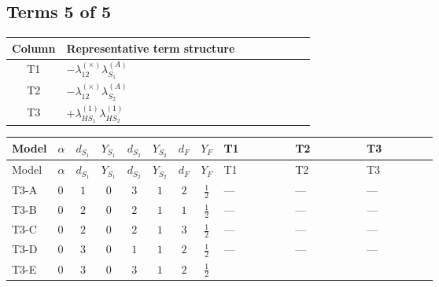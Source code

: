 \documentclass[8pt]{article}
\begin{document}
\begin{landscape}
\subsection*{Terms 5 of 5}
\begin{center}
\begin{tabular}{@{}c >{\raggedright\arraybackslash}p{0.82\linewidth}@{}}
\toprule
Column & Representative term structure \\
\midrule
T1 & \(\displaystyle -{\lambda_{12}^{(\times)}} {\lambda_{S_1}^{(A)}}\) \\
\midrule
T2 & \(\displaystyle -{\lambda_{12}^{(\times)}} {\lambda_{S_2}^{(A)}}\) \\
\midrule
T3 & \(\displaystyle +{\lambda_{HS_1}^{(1)}} {\lambda_{HS_2}^{(1)}}\) \\
\midrule
\bottomrule
\end{tabular}
\end{center}
\smallskip
\tiny
\begin{longtable}{@{}llcccccc >{\raggedright\arraybackslash}p{0.21\linewidth} >{\raggedright\arraybackslash}p{0.21\linewidth} >{\raggedright\arraybackslash}p{0.21\linewidth}@{}}
\toprule
Model & $\alpha$ & $d_{S_1}$ & $Y_{S_1}$ & $d_{S_2}$ & $Y_{S_2}$ & $d_F$ & $Y_F$ & T1 & T2 & T3 \\
\midrule
\endfirsthead
\toprule
Model & $\alpha$ & $d_{S_1}$ & $Y_{S_1}$ & $d_{S_2}$ & $Y_{S_2}$ & $d_F$ & $Y_F$ & T1 & T2 & T3 \\
\midrule
\endhead
T3-A & $0$ & $1$ & $0$ & $3$ & $1$ & $2$ & $\frac{1}{2}$ & --- & --- & --- \\
\midrule
T3-B & $0$ & $2$ & $0$ & $2$ & $1$ & $1$ & $\frac{1}{2}$ & --- & --- & --- \\
\midrule
T3-C & $0$ & $2$ & $0$ & $2$ & $1$ & $3$ & $\frac{1}{2}$ & --- & --- & --- \\
\midrule
T3-D & $0$ & $3$ & $0$ & $1$ & $1$ & $2$ & $\frac{1}{2}$ & --- & --- & --- \\
\midrule
T3-E & $0$ & $3$ & $0$ & $3$ & $1$ & $2$ & $\frac{1}{2}$ & \scriptsize\adjustbox{max width=\linewidth}{$\begin{gathered} -{\lambda_{12}^{(\times)}} {\lambda_{S_1}^{(A)}}\end{gathered}$} & \scriptsize\adjustbox{max width=\linewidth}{$\begin{gathered} -{\lambda_{12}^{(\times)}} {\lambda_{S_2}^{(A)}}\end{gathered}$} & \scriptsize\adjustbox{max width=\linewidth}{$\begin{gathered} +{\lambda_{HS_1}^{(1)}} {\lambda_{HS_2}^{(1)}}\end{gathered}$} \\
\midrule
\bottomrule
\end{longtable}
\clearpage

\end{landscape}
\end{document}
